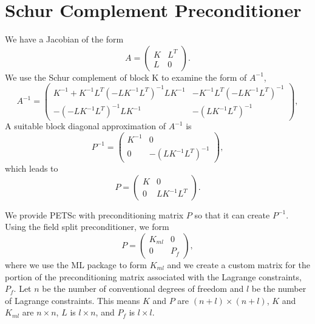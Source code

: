 \documentclass{article}[10pt]
\begin{document}
\section{Schur Complement Preconditioner}

We have a Jacobian of the form
\begin{equation}
  A = \left( \begin{array}{cc}
    K & L^T \\
    L & 0
  \end{array} \right).
\end{equation}
We use the Schur complement of block K to examine the form of $A^{-1}$,
\begin{equation}
  A^{-1} = \left( \begin{array}{cc}
    K^{-1}+K^{-1} L^{T}(-L K^{-1} L^{T})^{-1} L K^{-1} & 
    -K^{-1}L^{T}(-L K^{-1} L^{T})^{-1} \\
    -(-L K^{-1} L^{T})^{-1} L K^{-1} & -(L K^{-1} L^T)^{-1}
  \end{array} \right),
\end{equation}
A suitable block diagonal approximation of $A^{-1}$ is
\begin{equation}
  P^{-1} = \left( \begin{array}{cc}
    K^{-1} & 0 \\
    0 & -(L K^{-1} L^T)^{-1}
  \end{array} \right),
\end{equation}
which leads to
\begin{equation}
  P = \left( \begin{array}{cc}
    K & 0 \\
    0 & L K^{-1} L^T
  \end{array} \right).
\end{equation}

We provide PETSc with preconditioning matrix $P$ so that it can create
$P^{-1}$. Using the field split preconditioner, we form
\begin{equation}
  P = \left( \begin{array}{cc}
    K_\mathit{ml} & 0 \\
    0 & P_f
  \end{array} \right),
\end{equation}
where we use the ML package to form $K_\mathit{ml}$ and we create a
custom matrix for the portion of the preconditioning matrix associated with
the Lagrange constraints, $P_f$. Let $n$ be the number of conventional
degrees of freedom and $l$ be the number of Lagrange constraints. This
means $K$ and $P$ are $(n+l) \times (n+l)$, $K$ and $K_\mathit{ml}$
are $n \times n$, $L$ is $l \times n$, and $P_f$ is $l \times l$.
\end{document}
